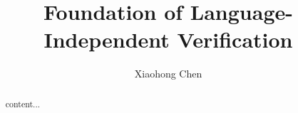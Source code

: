 \documentclass[draft]{amsbook}
\makeatletter
\renewcommand{\listoftodos}[1][\@todonotes@todolistname]{%
  \@starttoc{tdo}{#1}}
\theoremstyle{definition}
\theoremstyle{remark}
\numberwithin{section}{chapter}
\numberwithin{equation}{chapter}
\makeatother
\begin{document}
\frontmatter


\title{Foundation of Language-Independent Verification}




\author{Xiaohong Chen}
\address{University of Illinois at Urbana-Champaign, USA}


\keywords{}

\date{}

\begin{abstract}
content...
\end{abstract}

\maketitle


\setcounter{page}{4}

\tableofcontents

% 

\listoftodos

\mainmatter






\appendix
% 

\backmatter


\printindex
\end{document}
